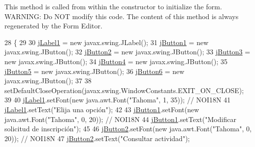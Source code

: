 This method is called from within the constructor to initialize the form. W\+A\+R\+N\+I\+NG\+: Do N\+OT modify this code. The content of this method is always regenerated by the Form Editor. 
\begin{DoxyCode}
28                                   \{
29 
30         \mbox{\hyperlink{classsoftware_1_1opcionespreso_a61c0885ed9ce31eca799d9b0507589b7}{jLabel1}} = \textcolor{keyword}{new} javax.swing.JLabel();
31         \mbox{\hyperlink{classsoftware_1_1opcionespreso_aa05af6874bd2369082e5aacf3b2bb50d}{jButton1}} = \textcolor{keyword}{new} javax.swing.JButton();
32         \mbox{\hyperlink{classsoftware_1_1opcionespreso_a965bd56cdf43ac702899aff6b882fe53}{jButton2}} = \textcolor{keyword}{new} javax.swing.JButton();
33         \mbox{\hyperlink{classsoftware_1_1opcionespreso_adf21589322eda1079c8f08265ec86a83}{jButton3}} = \textcolor{keyword}{new} javax.swing.JButton();
34         \mbox{\hyperlink{classsoftware_1_1opcionespreso_a7fe878181ce5171fa1a59956d589d900}{jButton4}} = \textcolor{keyword}{new} javax.swing.JButton();
35         \mbox{\hyperlink{classsoftware_1_1opcionespreso_a5948e430eec5399935a10ca8300296df}{jButton5}} = \textcolor{keyword}{new} javax.swing.JButton();
36         \mbox{\hyperlink{classsoftware_1_1opcionespreso_af727e23b9f6fb213484737b6fb3a63d9}{jButton6}} = \textcolor{keyword}{new} javax.swing.JButton();
37 
38         setDefaultCloseOperation(javax.swing.WindowConstants.EXIT\_ON\_CLOSE);
39 
40         \mbox{\hyperlink{classsoftware_1_1opcionespreso_a61c0885ed9ce31eca799d9b0507589b7}{jLabel1}}.setFont(\textcolor{keyword}{new} java.awt.Font(\textcolor{stringliteral}{"Tahoma"}, 1, 35)); \textcolor{comment}{// NOI18N}
41         \mbox{\hyperlink{classsoftware_1_1opcionespreso_a61c0885ed9ce31eca799d9b0507589b7}{jLabel1}}.setText(\textcolor{stringliteral}{"Elija una opción"});
42 
43         \mbox{\hyperlink{classsoftware_1_1opcionespreso_aa05af6874bd2369082e5aacf3b2bb50d}{jButton1}}.setFont(\textcolor{keyword}{new} java.awt.Font(\textcolor{stringliteral}{"Tahoma"}, 0, 20)); \textcolor{comment}{// NOI18N}
44         \mbox{\hyperlink{classsoftware_1_1opcionespreso_aa05af6874bd2369082e5aacf3b2bb50d}{jButton1}}.setText(\textcolor{stringliteral}{"Modificar solicitud de inscripción"});
45 
46         \mbox{\hyperlink{classsoftware_1_1opcionespreso_a965bd56cdf43ac702899aff6b882fe53}{jButton2}}.setFont(\textcolor{keyword}{new} java.awt.Font(\textcolor{stringliteral}{"Tahoma"}, 0, 20)); \textcolor{comment}{// NOI18N}
47         \mbox{\hyperlink{classsoftware_1_1opcionespreso_a965bd56cdf43ac702899aff6b882fe53}{jButton2}}.setText(\textcolor{stringliteral}{"Consultar actividad"});

\end{DoxyCode}
